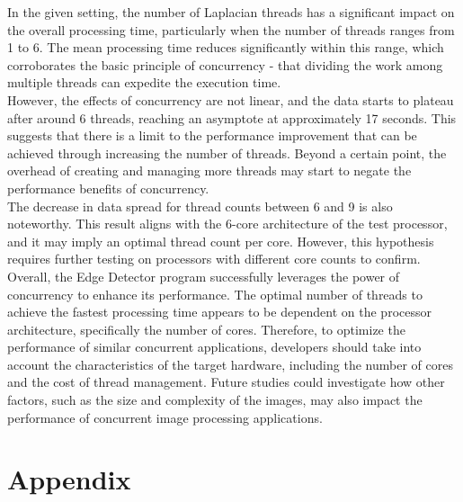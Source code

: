 \documentclass{article}
\begin{document}
In the given setting, the number of Laplacian threads has a significant
impact on the overall processing time, particularly when the number of
threads ranges from 1 to 6. The mean processing time reduces significantly
within this range, which corroborates the basic principle of concurrency
- that dividing the work among multiple threads can expedite the execution time. \\

However, the effects of concurrency are not linear, and the data starts
to plateau after around 6 threads, reaching an asymptote at approximately
17 seconds. This suggests that there is a limit to the performance
improvement that can be achieved through increasing the number of threads.
Beyond a certain point, the overhead of creating and managing more threads
may start to negate the performance benefits of concurrency. \\

The decrease in data spread for thread counts between 6 and 9 is also
noteworthy. This result aligns with the 6-core architecture of the test
processor, and it may imply an optimal thread count per core. However,
this hypothesis requires further testing on processors with different core counts to confirm. \\

Overall, the Edge Detector program successfully leverages the power
of concurrency to enhance its performance. The optimal number of threads
to achieve the fastest processing time appears to be dependent on the
processor architecture, specifically the number of cores. Therefore,
to optimize the performance of similar concurrent applications,
developers should take into account the characteristics of the target
hardware, including the number of cores and the cost of thread management.
Future studies could investigate how other factors, such as the size and
complexity of the images, may also impact the performance of concurrent
image processing applications. \\

\clearpage
\appendix
\section*{Appendix}
\end{document}
